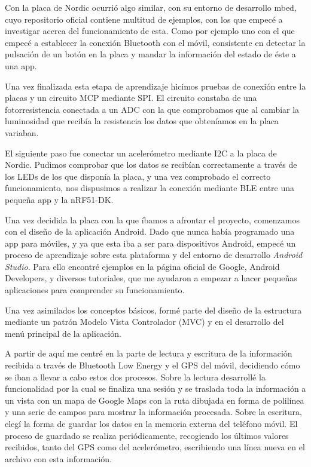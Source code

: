 Con la placa de Nordic ocurrió algo similar, con su entorno de desarrollo mbed, cuyo repositorio oficial contiene multitud de ejemplos, con los que empecé a investigar acerca del funcionamiento de esta. Como por ejemplo uno con el que empecé a establecer la conexión Bluetooth con el móvil, consistente en detectar la pulsación de un botón en la placa y mandar la información del estado de éste a una app.

Una vez finalizada esta etapa de aprendizaje hicimos pruebas de conexión entre la placas y un circuito MCP mediante SPI. El circuito constaba de una fotorresistencia conectada a un ADC con la que comprobamos que al cambiar la luminosidad que recibía la resistencia los datos que obteníamos en la placa variaban. 

El siguiente paso fue conectar un acelerómetro mediante I2C a la placa de Nordic. Pudimos comprobar que los datos se recibían correctamente a través de los LEDs de los que disponía la placa, y una vez comprobado el correcto funcionamiento, nos dispusimos a realizar la conexión mediante BLE entre una pequeña app y la nRF51-DK. 

Una vez decidida la placa con la que íbamos a afrontar el proyecto, comenzamos con el diseño de la aplicación Android. Dado que nunca había programado una app para móviles, y ya que esta iba a ser para dispositivos Android, empecé un proceso de aprendizaje sobre esta plataforma y del entorno de desarrollo \textit{Android Studio}. Para ello encontré ejemplos en la página oficial de Google, Android Developers, y diversos tutoriales, que me ayudaron a empezar a hacer pequeñas aplicaciones para comprender su funcionamiento.

Una vez asimilados los conceptos básicos, formé parte del diseño de la estructura mediante un patrón Modelo Vista Controlador (MVC) y en el desarrollo del menú principal de la aplicación. 

A partir de aquí me centré en la parte de lectura y escritura de la información recibida a través de Bluetooth Low Energy y el GPS del móvil, decidiendo cómo se iban a llevar a cabo estos dos procesos. 
Sobre la lectura desarrollé la funcionalidad por la cual se finaliza una sesión y se traslada toda la información a un vista con un mapa de Google Maps con la ruta dibujada en forma de polilínea y una serie de campos para mostrar la información procesada. 
Sobre la escritura, elegí la forma de guardar los datos en la memoria externa del teléfono móvil. El proceso de guardado se realiza periódicamente, recogiendo los últimos valores recibidos, tanto del GPS como del acelerómetro, escribiendo una línea nueva en el archivo con esta información.

